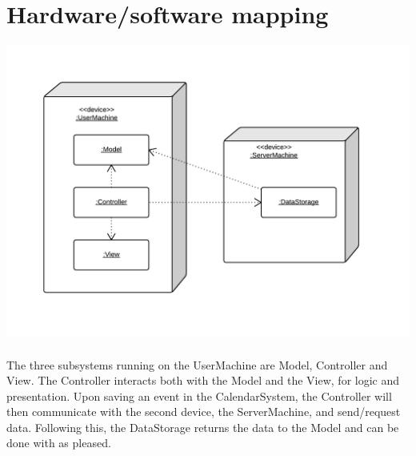 \section{Hardware/software mapping}
\includegraphics[scale=0.4]{HardwareSoftwareMapping}\\\\
The three subsystems running on the UserMachine are Model, Controller and View. The Controller interacts both with the Model and the View, for logic and presentation. Upon saving an event in the CalendarSystem, the Controller will then communicate with the second device, the ServerMachine, and send/request data. Following this, the DataStorage returns the data to the Model and can be done with as pleased.